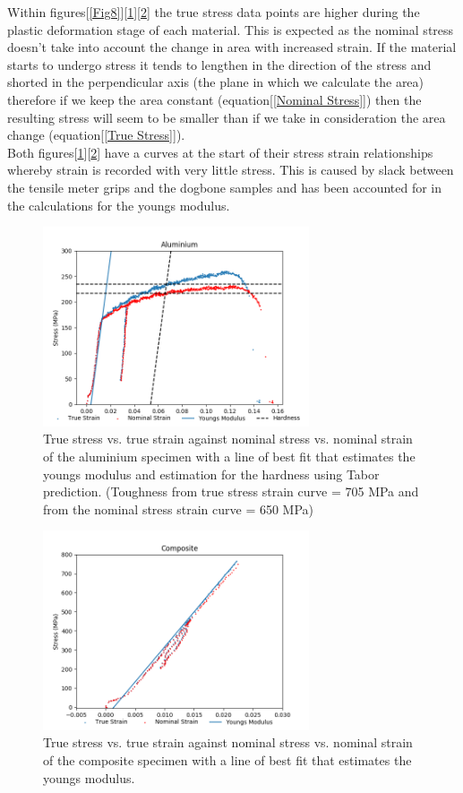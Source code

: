 \documentclass[a4paper,10pt]{article}
\begin{document}
Within figures[\ref{Fig8}][\ref{Fig9}][\ref{Fig10}] the true stress data points are higher during the plastic deformation stage of each material. This is expected as the nominal stress doesn't take into account the change in area with increased strain. If the material starts to undergo stress it tends to lengthen in the direction of the stress and shorted in the perpendicular axis (the plane in which we calculate  the area) therefore if we keep the area constant (equation[\ref{Nominal Stress}]) then the resulting stress will seem to be smaller than if we take in consideration the area change (equation[\ref{True Stress}]).\\[8pt]
Both figures[\ref{Fig9}][\ref{Fig10}] have a curves at the start of their stress strain relationships whereby strain is recorded with very little stress. This is caused by slack between the tensile meter grips and the dogbone samples and has been accounted for in the calculations for the youngs modulus.
\begin{figure}[!]
\centering
\includegraphics[width=0.7\textwidth]{figure_2_al.png}
\caption{True stress vs. true strain against nominal stress vs. nominal strain of the aluminium specimen with a line of best fit that estimates the youngs modulus and estimation for the hardness using Tabor prediction. (Toughness from true stress strain curve = 705 MPa and from the nominal stress strain curve = 650 MPa)}
\label{Fig9}
\end{figure}

\begin{figure}[!]
\centering
\includegraphics[width=0.7\textwidth]{figure_2_comp.png}
\caption{True stress vs. true strain against nominal stress vs. nominal strain of the composite specimen with a line of best fit that estimates the youngs modulus.}
\label{Fig10}
\end{figure}
\end{document}

